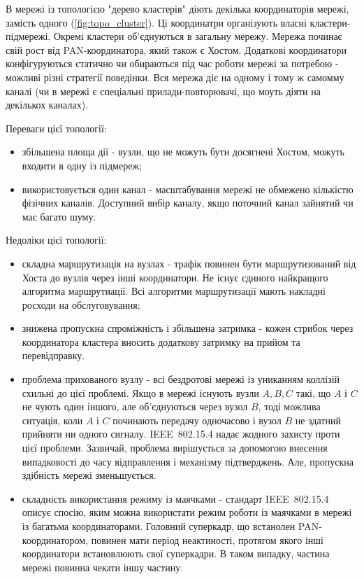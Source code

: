 \documentclass[a4paper,ukrainian,utf8,nocolumnsxix,floatsection,equationsection]{eskdtext}
\newcommand{\iee}[0]{IEEE~802.15.4\xspace}
\begin{document}
В мережі із топологією "дерево кластерів" діють декілька координаторів мережі, замість одного (\ref{fig:topo_cluster}). Ці координатри організують власні кластери-підмережі. Окремі кластери об’єднуються в загальну мережу. Мережа починає свій рост від PAN-координатора, який також є Хостом. Додаткові координатори конфігуруються статично чи обираються під час роботи мережі за потребою - можливі різні стратегії поведінки. Вся мережа діє на одному і тому ж самомму каналі (чи в мережі є спеціальні прилади-повторювачі, що моуть діяти на декількох каналах).

Переваги цієї топології:
\begin{itemize}
	\item збільшена площа дії - вузли, що не можуть бути досягнені Хостом, можуть входити в одну із підмереж;
	\item використовується один канал - масштабування мережі не обмежено кількістю фізічних каналів. Доступний вибір каналу, якщо поточний канал зайнятий чи має багато шуму.
\end{itemize}

Недоліки цієї топології:
\begin{itemize}
	\item складна маршрутизація на вузлах - трафік повинен бути маршрутизований від Хоста до вузлів через інші координатори. Не існує єдиного найкращого алгоритма маршрутиації. Всі алгоритми маршрутизації мають накладні росходи на обслуговування;
	\item знижена пропускна спроміжність і збільшена затримка - кожен стрибок через координатора кластера вносить додаткову затримку на прийом та перевідправку. 
	\item проблема прихованого вузлу - всі бездротові мережі із униканням коллізій схильні до цієї проблемі. Якщо в мережі існують вузли $A,B,C$ такі, що $A$ і $C$ не чують один іншого, але об’єднуються через вузол $B$, тоді можлива ситуація, коли $A$ і $C$ починають передачу одночасово і вузол $B$ не здатний прийняти ни одного сигналу. \iee надає жодного захисту проти цієї проблеми. Зазвичай, проблема вирішується за допомогою внесення випадковості до часу відправлення і механізму підтверджень. Але, пропускна здібність мережі зменьшується.
	\item складність використання режиму із маячками - стандарт \iee описує спосію, яким можна використати режим роботи із маячками в мережі із багатьма координаторами. Головний суперкадр, що встанолен PAN-координатором, повинен мати період неактиності, протягом якого інші координатори встановлюють свої суперкадри. В таком випадку, частина мережі повинна чекати іншу частину.
\end{itemize}
\end{document}

